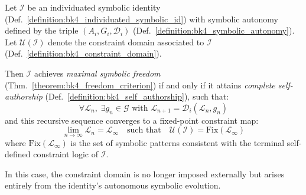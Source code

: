 \begin{theorem}
\label{theorem:bk4_self_authorship_and_freedom}
Let $\mathcal{I}$ be an individuated symbolic identity (Def.~\ref{definition:bk4_individuated_symbolic_id}) with symbolic autonomy defined by the triple $(A_i, G_i, \mathcal{D}_i)$ (Def.~\ref{definition:bk4_symbolic_autonomy}). Let $\mathcal{U}(\mathcal{I})$ denote the constraint domain associated to $\mathcal{I}$ (Def.~\ref{definition:bk4_constraint_domain}).

Then $\mathcal{I}$ achieves \emph{maximal symbolic freedom} (Thm.~\ref{theorem:bk4_freedom_criterion}) if and only if it attains \emph{complete self-authorship} (Def.~\ref{definition:bk4_self_authorship}), such that:
\begin{equation}
    \forall \mathcal{L}_n, \; \exists g_n \in \mathcal{G} \text{ with } \mathcal{L}_{n+1} = \mathcal{D}_i(\mathcal{L}_n, g_n)
\end{equation}
and this recursive sequence converges to a fixed-point constraint map:
\begin{equation}
    \lim_{n \to \infty} \mathcal{L}_n = \mathcal{L}_\infty \quad \text{such that} \quad \mathcal{U}(\mathcal{I}) = \text{Fix}(\mathcal{L}_\infty)
\end{equation}
where $\text{Fix}(\mathcal{L}_\infty)$ is the set of symbolic patterns consistent with the terminal self-defined constraint logic of $\mathcal{I}$.

In this case, the constraint domain is no longer imposed externally but arises entirely from the identity’s autonomous symbolic evolution.
\end{theorem}

